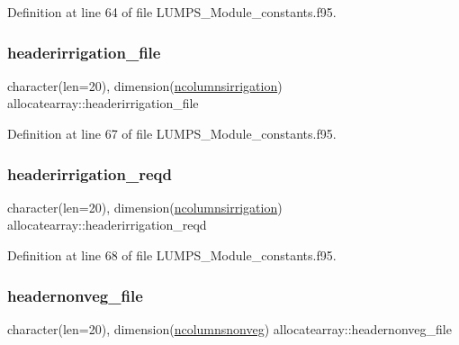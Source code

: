 Definition at line 64 of file L\+U\+M\+P\+S\+\_\+\+Module\+\_\+constants.\+f95.

\mbox{\label{namespaceallocatearray_abdd6fb7f3cb84c748a69991e7238514b}} 
\subsubsection{\texorpdfstring{headerirrigation\+\_\+file}{headerirrigation\_file}}
{\footnotesize\ttfamily character(len=20), dimension(\hyperlink{namespaceallocatearray_ae577fdefdd007ae24a4d46e52bbcd217}{ncolumnsirrigation}) allocatearray\+::headerirrigation\+\_\+file}



Definition at line 67 of file L\+U\+M\+P\+S\+\_\+\+Module\+\_\+constants.\+f95.

\mbox{\label{namespaceallocatearray_a954868db4fef915c78d7daa2ba68e8dc}} 
\subsubsection{\texorpdfstring{headerirrigation\+\_\+reqd}{headerirrigation\_reqd}}
{\footnotesize\ttfamily character(len=20), dimension(\hyperlink{namespaceallocatearray_ae577fdefdd007ae24a4d46e52bbcd217}{ncolumnsirrigation}) allocatearray\+::headerirrigation\+\_\+reqd}



Definition at line 68 of file L\+U\+M\+P\+S\+\_\+\+Module\+\_\+constants.\+f95.

\mbox{\label{namespaceallocatearray_a1acf417768a18d09c33f89053383fd90}} 
\subsubsection{\texorpdfstring{headernonveg\+\_\+file}{headernonveg\_file}}
{\footnotesize\ttfamily character(len=20), dimension(\hyperlink{namespaceallocatearray_a820ebcf66504982dee392a9c3a224fe2}{ncolumnsnonveg}) allocatearray\+::headernonveg\+\_\+file}



